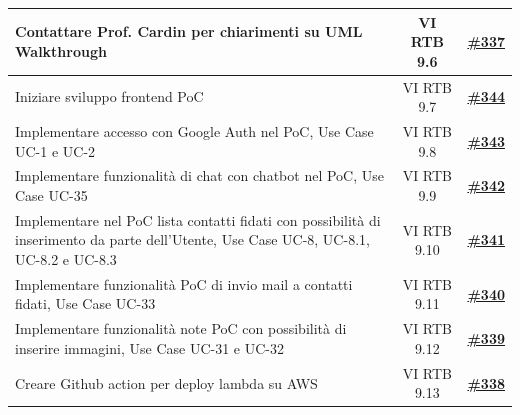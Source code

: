 \documentclass[a4paper,12pt]{article}
\newcommand{\ignoreglossary}{}
\begin{document}
\begin{center}
\begin{tabular}{|p{}|c|c|}
\hline
\rowcolor{white}
Contattare Prof. Cardin per chiarimenti su UML Walkthrough & VI \ignoreglossary{RTB} 9.6 & \href{https://github.com/SWE-BitByBit/SWE-docs/issues/337}{\textbf{\#337}} \\
\hline
\rowcolor{gray!20}
Iniziare sviluppo frontend PoC & VI \ignoreglossary{RTB} 9.7 & \href{https://github.com/SWE-BitByBit/SWE-docs/issues/344}{\textbf{\#344}} \\
\hline
\rowcolor{white}
Implementare accesso con Google Auth nel PoC, Use Case UC-1 e UC-2 & VI \ignoreglossary{RTB} 9.8 & \href{https://github.com/SWE-BitByBit/SWE-docs/issues/343}{\textbf{\#343}} \\
\hline
\rowcolor{gray!20}
Implementare funzionalità di chat con chatbot nel PoC, Use Case UC-35 & VI \ignoreglossary{RTB} 9.9 & \href{https://github.com/SWE-BitByBit/SWE-docs/issues/342}{\textbf{\#342}} \\
\hline
\rowcolor{white}
Implementare nel PoC lista contatti fidati con possibilità di inserimento da parte dell'Utente, Use Case UC-8, UC-8.1, UC-8.2 e UC-8.3 & VI \ignoreglossary{RTB} 9.10 & \href{https://github.com/SWE-BitByBit/SWE-docs/issues/341}{\textbf{\#341}} \\
\hline
\rowcolor{gray!20}
Implementare funzionalità PoC di invio mail a contatti fidati, Use Case UC-33 & VI \ignoreglossary{RTB} 9.11 & \href{https://github.com/SWE-BitByBit/SWE-docs/issues/340}{\textbf{\#340}} \\
\hline
\rowcolor{white}
Implementare funzionalità note PoC con possibilità di inserire immagini, Use Case UC-31 e UC-32 & VI \ignoreglossary{RTB} 9.12 & \href{https://github.com/SWE-BitByBit/SWE-docs/issues/339}{\textbf{\#339}} \\
\hline
\rowcolor{gray!20}
Creare Github action per deploy lambda su AWS & VI \ignoreglossary{RTB} 9.13 & \href{https://github.com/SWE-BitByBit/SWE-docs/issues/338}{\textbf{\#338}} \\
\hline
\end{tabular}
\end{center}
\end{document}
